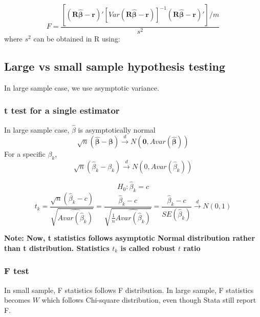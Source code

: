 \documentclass[12pt]{article}
\begin{document}
\begin{equation*}
F = \frac{
		[(\bm{R  \widehat{\beta} - r})'[Var(\bm{R  \widehat{\beta} - r})]^{ - 1}
		(\bm{R  \widehat{\beta} - r})']/m
}{s^{2}} 
\end{equation*}
where $ s^{2} $ can be obtained in R using:
\begin{figure}[H]
\end{figure}



\subsection{Large vs small sample hypothesis testing}
In large sample case, we use asymptotic variance.


\subsubsection{t test for a single estimator}
In large sample case, $  \widehat{\beta} $ is asymptotically normal 
\begin{equation*}
		\sqrt {n}(\bm{ \widehat{\beta} - \beta}) \xrightarrow{d}N(\bm{0}, Avar(\bm{ \widehat{\beta}}))
\end{equation*}
For a specific $ \beta_{k} $,
\begin{equation*}
\sqrt {n}( \widehat{\beta}_{k} - \beta_{k}) \xrightarrow{d}N(0, Avar( \widehat{\beta}
_{k}))
\end{equation*}

\begin{equation*}
H_0:  \widehat{\beta}_{k} = c
\end{equation*}
\begin{equation*}
t_{k} = \frac{\sqrt {n}( \widehat{\beta}_{k} - c)}{
 \sqrt {\widehat{Avar( \widehat{\beta}_{k})}}
		} = 
\frac{ \widehat{\beta}_{k} - c}{
\sqrt {\frac{1}{n}\widehat{Avar( \widehat{\beta}_{k})}}
}=
\frac{ \widehat{\beta}_{k} - c}{
SE( \widehat{\beta}_{k})
}\xrightarrow{d} N(0,1)
\end{equation*}


{\textbf {Note: Now, t statistics follows asymptotic Normal distribution rather than t 
distribution. Statistics $ t_{k} $ is called robust $ t $ ratio}}


\subsubsection{F test}
In small sample, F statistics follows F distribution. In large sample, F statistics 
becomes $ W $ which follows Chi-square distribution, even though Stata still report F.
\end{document}
